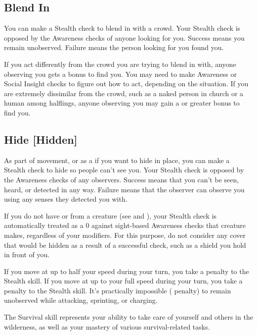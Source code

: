     \subsection{Blend In}
        You can make a Stealth check to blend in with a crowd. Your Stealth check is opposed by the Awareness checks of anyone looking for you. Success means you remain unobserved. Failure means the person looking for you found you.

        If you act differently from the crowd you are trying to blend in with, anyone observing you gets a  bonus to find you. You may need to make Awareness or Social Insight checks to figure out how to act, depending on the situation. If you are extremely dissimilar from the crowd, such as a naked person in church or a human among halflings, anyone observing you may gain a  or greater bonus to find you.

    \subsection{Hide [Hidden]}
        As part of movement, or as a  if you want to hide in place, you can make a Stealth check to hide so people can't see you.
        Your Stealth check is opposed by the Awareness checks of any observers.
        Success means that you can't be seen, heard, or detected in any way.
        Failure means that the observer can observe you using any senses they detected you with.

        If you do not have  or  from a creature (see  and ), your Stealth check is automatically treated as a 0 against sight-based Awareness checks that creature makes, regardless of your modifiers.
        For this purpose, do not consider any cover that would be hidden as a result of a successful check, such as a shield you hold in front of you.

        If you move at up to half your speed during your turn, you take a  penalty to the Stealth skill.
        If you move at up to your full speed during your turn, you take a  penalty to the Stealth skill.
        It's practically impossible ( penalty) to remain unobserved while attacking, sprinting, or charging.

\newpage
{}
        The Survival skill represents your ability to take care of yourself and others in the wilderness, as well as your mastery of various survival-related tasks.

